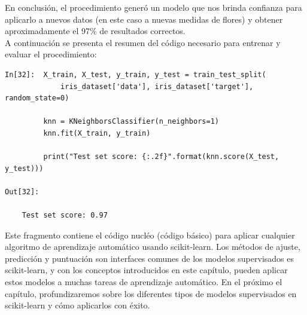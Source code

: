 En conclusión, el procedimiento generó un modelo que nos brinda  confianza para aplicarlo a nuevos datos (en este caso a nuevas medidas de flores)  y obtener aproximadamente el 97\%  de resultados correctos.\\


A continuación se presenta el resumen del código necesario para entrenar y evaluar el procedimiento:\\


\begin{lstlisting}
In[32]:  X_train, X_test, y_train, y_test = train_test_split(
             iris_dataset['data'], iris_dataset['target'], random_state=0)
         
         knn = KNeighborsClassifier(n_neighbors=1)
         knn.fit(X_train, y_train)
         
         print("Test set score: {:.2f}".format(knn.score(X_test, y_test)))

Out[32]:

    Test set score: 0.97
\end{lstlisting}


 Este fragmento contiene el  código nucléo (código básico) para aplicar cualquier algoritmo de aprendizaje automático usando scikit-learn.  Los métodos de ajuste, predicción y puntuación son interfaces comunes de los modelos supervisados es {\ttfamily scikit-learn}, y con los conceptos introducidos en este capítulo,
 pueden aplicar estos modelos a muchas tareas de aprendizaje automático.  En el próximo el capítulo, profundizaremos sobre los diferentes tipos de modelos supervisados en  {\ttfamily scikit-learn} y cómo aplicarlos con éxito.

%

\newpage



